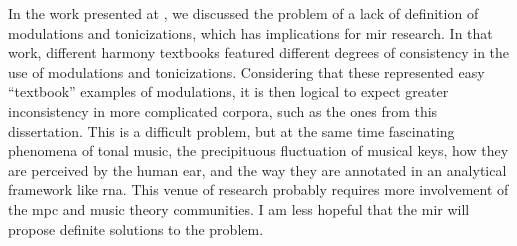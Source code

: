 
In the work presented at \textcite{napoleslopez2020local},
we discussed the problem of a lack of definition of
modulations and tonicizations, which has implications for
\gls{mir} research. In that work, different harmony
textbooks featured different degrees of consistency in the
use of modulations and tonicizations. Considering that these
represented  easy ``textbook'' examples of modulations, it
is then logical to expect greater inconsistency in more
complicated corpora, such as the ones from this
dissertation. This is a difficult problem, but at the same
time fascinating phenomena of tonal music, the precipituous
fluctuation of musical keys, how they are perceived by the
human ear, and the way they are annotated in an analytical
framework like \gls{rna}. This venue of research probably
requires more involvement of the \gls{mpc} and music theory
communities. I am less hopeful that the \gls{mir} will
propose definite solutions to the problem.
